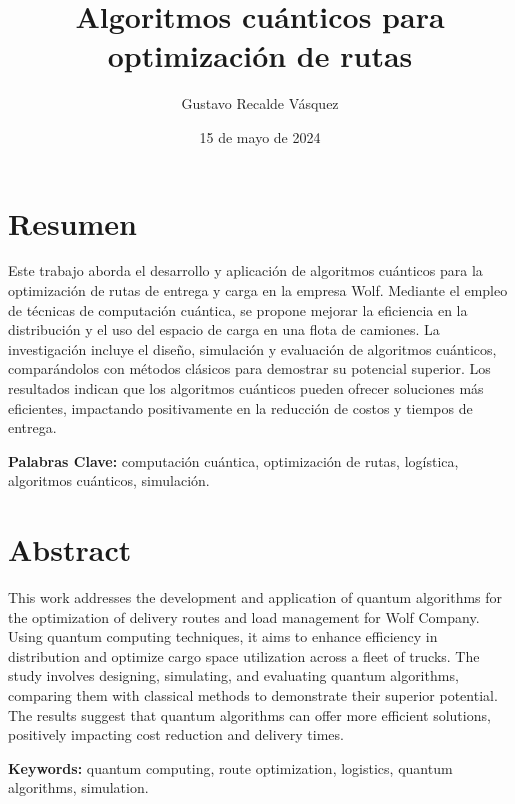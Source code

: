 \documentclass[11pt,a4paper,spanish]{book}
\title{ Algoritmos cuánticos para optimización de rutas}
\author{ Gustavo Recalde Vásquez}
\date{ 15 de mayo de 2024}
\begin{document}
\renewcommand{\listfigurename}{Índice de Ilustraciones}
\renewcommand{\listtablename}{Índice de Tablas}
\renewcommand{\contentsname}{Índice de Contenidos}
\renewcommand{\figurename}{Figura}
\renewcommand{\tablename}{Tabla} 

\maketitle

\frontmatter
\tableofcontents
\listoffigures
\listoftables

\chapter{Resumen}

Este trabajo aborda el desarrollo y aplicación de algoritmos cuánticos para la optimización de rutas de entrega y carga en la empresa Wolf. Mediante el empleo de técnicas de computación cuántica, se propone mejorar la eficiencia en la distribución y el uso del espacio de carga en una flota de camiones. La investigación incluye el diseño, simulación y evaluación de algoritmos cuánticos, comparándolos con métodos clásicos para demostrar su potencial superior. Los resultados indican que los algoritmos cuánticos pueden ofrecer soluciones más eficientes, impactando positivamente en la reducción de costos y tiempos de entrega.

{\bf Palabras Clave:} computación cuántica, optimización de rutas, logística, algoritmos cuánticos, simulación.


\chapter{Abstract}

This work addresses the development and application of quantum algorithms for the optimization of delivery routes and load management for Wolf Company. Using quantum computing techniques, it aims to enhance efficiency in distribution and optimize cargo space utilization across a fleet of trucks. The study involves designing, simulating, and evaluating quantum algorithms, comparing them with classical methods to demonstrate their superior potential. The results suggest that quantum algorithms can offer more efficient solutions, positively impacting cost reduction and delivery times.

{\bf Keywords:} quantum computing, route optimization, logistics, quantum algorithms, simulation.
\end{document}
